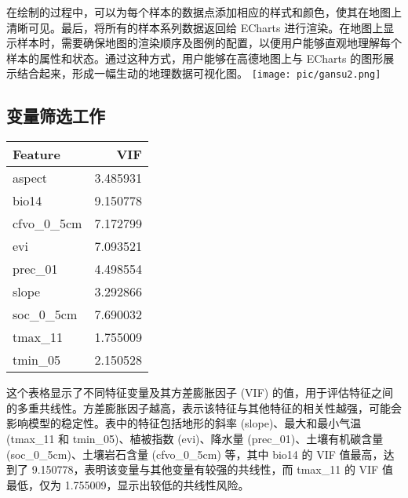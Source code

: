 \documentclass{article}
\begin{document}
在绘制的过程中，可以为每个样本的数据点添加相应的样式和颜色，使其在地图上清晰可见。最后，将所有的样本系列数据返回给 ECharts 进行渲染。在地图上显示样本时，需要确保地图的渲染顺序及图例的配置，以便用户能够直观地理解每个样本的属性和状态。通过这种方式，用户能够在高德地图上与 ECharts 的图形展示结合起来，形成一幅生动的地理数据可视化图。
\texttt{[image: pic/gansu2.png]} %
	\subsection{变量筛选工作}
	\begin{tabular}{lr}
		\toprule
		Feature & VIF \\
		\midrule
		aspect & 3.485931 \\
		bio14 & 9.150778 \\
		cfvo\_0\_5cm & 7.172799 \\
		evi & 7.093521 \\
		prec\_01 & 4.498554 \\
		slope & 3.292866 \\
		soc\_0\_5cm & 7.690032 \\
		tmax\_11 & 1.755009 \\
		tmin\_05 & 2.150528 \\
		\bottomrule
	\end{tabular}
	
	这个表格显示了不同特征变量及其方差膨胀因子 (VIF) 的值，用于评估特征之间的多重共线性。方差膨胀因子越高，表示该特征与其他特征的相关性越强，可能会影响模型的稳定性。表中的特征包括地形的斜率 (slope)、最大和最小气温 (tmax\_11 和 tmin\_05)、植被指数 (evi)、降水量 (prec\_01)、土壤有机碳含量 (soc\_0\_5cm)、土壤岩石含量 (cfvo\_0\_5cm) 等，其中 bio14 的 VIF 值最高，达到了 9.150778，表明该变量与其他变量有较强的共线性，而 tmax\_11 的 VIF 值最低，仅为 1.755009，显示出较低的共线性风险。
	
	
\end{document}
